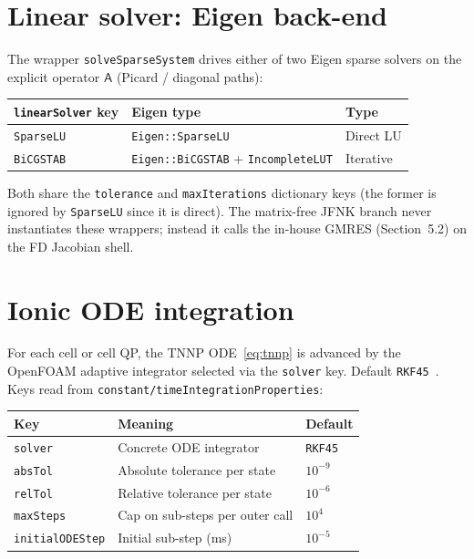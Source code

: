 \documentclass[11pt,a4paper]{article}
\newcommand{\Aimp}{\mathsf{A}}
\newcommand{\code}[1]{\texttt{\small #1}}
\begin{document}
\section{Linear solver: Eigen back-end}

The wrapper \code{solveSparseSystem} drives either of two Eigen sparse
solvers on the explicit operator $\Aimp$ (Picard / diagonal paths):

\begin{center}
\begin{tabular}{@{}lll@{}}
\toprule
\code{linearSolver} key & Eigen type & Type \\
\midrule
\code{SparseLU}  & \code{Eigen::SparseLU} & Direct LU \\
\code{BiCGSTAB}  & \code{Eigen::BiCGSTAB} + \code{IncompleteLUT} & Iterative \\
\bottomrule
\end{tabular}
\end{center}

Both share the \code{tolerance} and \code{maxIterations} dictionary
keys (the former is ignored by \code{SparseLU} since it is direct).
The matrix-free JFNK branch never instantiates these wrappers; instead
it calls the in-house GMRES (Section~5.2) on the FD Jacobian shell.

\section{Ionic ODE integration}

For each cell or cell QP, the TNNP ODE~\eqref{eq:tnnp} is advanced by
the OpenFOAM adaptive integrator selected via the \code{solver} key.
Default \code{RKF45}~\cite{hairer2}. Keys read from
\code{constant/timeIntegrationProperties}:

\begin{center}
\begin{tabular}{@{}lll@{}}
\toprule
Key & Meaning & Default \\
\midrule
\code{solver} & Concrete ODE integrator & \code{RKF45} \\
\code{absTol} & Absolute tolerance per state & $10^{-9}$ \\
\code{relTol} & Relative tolerance per state & $10^{-6}$ \\
\code{maxSteps} & Cap on sub-steps per outer call & $10^{4}$ \\
\code{initialODEStep} & Initial sub-step (ms) & $10^{-5}$ \\
\bottomrule
\end{tabular}
\end{center}
\end{document}
